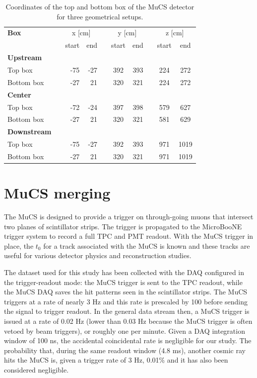 \documentclass[a4paper]{scrartcl}
\renewcommand{\arraystretch}{1.2}
\newcommand{\ra}[1]{\renewcommand{\arraystretch}{#1}}
\begin{document}
\begin{table}[htbp]
  \centering
  \ra{1.2}
  \begin{tabular}{lcrrrccccc}
    \toprule
    \textbf{Box} & \phantom{abc}& \multicolumn{2}{c}{x [cm]} & \phantom{abc} & \multicolumn{2}{c}{y [cm]} & \phantom{abc} & \multicolumn{2}{c}{z [cm]}\\
    \cmidrule{3-4} \cmidrule{6-7} \cmidrule{9-10}
    & & start & end & & start & end & & start & end\\
    \midrule

    \textbf{Upstream} & & & & & & & & & \\
    Top box & & -75 & -27 & & 392 & 393 & & 224 & 272\\
    Bottom box & & -27 & 21 & & 320 & 321 & & 224 & 272\\

    \midrule
    \textbf{Center} & & & & & & & & & \\
    Top box & & -72 & -24 & & 397 & 398 & & 579 & 627\\
    Bottom box & & -27 & 21 & & 320 & 321 & & 581 & 629\\
    \midrule
    \textbf{Downstream} & & & & & & & & & \\
    Top box & & -75 & -27 & & 392 & 393 & & 971 & 1019\\
    Bottom box & & -27 & 21 & & 320 & 321 & & 971 & 1019\\
    \bottomrule

  \end{tabular}
  \caption{Coordinates of the top and bottom box of the MuCS detector for three geometrical setups.}\label{tab:mucs}
\end{table}


\section{MuCS merging}\label{sec:merging}
The MuCS is designed to provide a trigger on through-going muons that intersect two planes of scintillator strips. The trigger is propagated to the MicroBooNE trigger system to record a full TPC and PMT readout. With the MuCS trigger in place, the $t_0$ for a track associated with the MuCS is known and these tracks are useful for various detector physics and reconstruction studies.

The dataset used for this study has been collected with the DAQ configured in the trigger-readout mode: the MuCS trigger is sent to the TPC readout, while the MuCS DAQ saves the hit patterns seen in the scintillator strips.
The MuCS triggers at a rate of nearly 3 Hz and this rate is prescaled by 100 before sending the signal to trigger readout. In the general data stream then, a MuCS trigger is issued at a rate of 0.02 Hz (lower than 0.03 Hz because the MuCS trigger is often vetoed by beam triggers), or roughly one per minute.
Given a DAQ integration window of 100 ns, the accidental coincidental rate is negligible for our study. The probability that, during the same readout window (4.8 ms), another cosmic ray hits the MuCS is, given a trigger rate of 3 Hz, 0.01\% and it has also been considered negligible.
\end{document}

